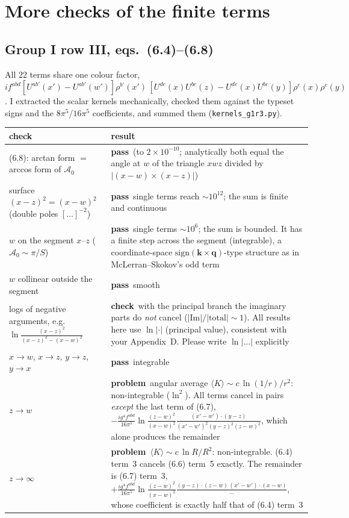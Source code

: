\documentclass[10pt]{article}
\newcommand{\ok}{\textcolor{green!45!black}{\textbf{pass}}}
\newcommand{\bad}{\textcolor{red!70!black}{\textbf{problem}}}
\newcommand{\warn}{\textcolor{orange!85!black}{\textbf{check}}}
\begin{document}
\section{More checks of the finite terms}\label{sec:more}
\subsection{Group I row III, eqs.~(6.4)--(6.8)}
All 22 terms share one colour factor, $i f^{abd}[U^{ab'}(x')-U^{ab'}(w')]\rho^{b'}(x')\,[U^{de}(x)U^{bc}(z)-U^{de}(x)U^{bc}(y)]\rho^e(x)\rho^c(y)$.
I extracted the scalar kernels mechanically, checked them against the typeset signs and the $8\pi^5$/$16\pi^5$ coefficients, and summed them (\texttt{kernels\_g1r3.py}).
\begin{center}
\begin{tabular}{p{6.2cm}p{9.2cm}}
\toprule
check & result\\
\midrule
(6.8): arctan form $=$ arccos form of $\mathcal A_0$ & \ok\ (to $2\times10^{-10}$; analytically both equal the angle at $w$ of the triangle $xwz$ divided by $|(x-w)\times(x-z)|$)\\
surface $(x-z)^2=(x-w)^2$ (double poles $[\dots]^{-2}$) & \ok\ single terms reach $\sim10^{12}$; the sum is finite and continuous\\
$w$ on the segment $x$--$z$ ($\mathcal A_0\sim\pi/S$) & \ok\ single terms $\sim10^6$; the sum is bounded. It has a finite step across the segment (integrable), a coordinate-space $\mathrm{sign}(\mathbf k\times\mathbf q)$-type structure as in McLerran--Skokov's odd term\\
$w$ collinear outside the segment & \ok\ smooth\\
logs of negative arguments, e.g.\ $\ln\frac{(x-z)^2}{(x-z)^2-(x-w)^2}$ & \warn\ with the principal branch the imaginary parts do \emph{not} cancel ($|\mathrm{Im}|/|\mathrm{total}|\sim1$). All results here use $\ln|\cdot|$ (principal value), consistent with your Appendix~D. Please write $\ln|\dots|$ explicitly\\
$x\to w$, $x\to z$, $y\to z$, $y\to x$ & \ok\ integrable\\
$z\to w$ & \bad\ angular average $\langle K\rangle\sim c\,\ln(1/r)/r^2$: non-integrable ($\ln^2$). All terms cancel in pairs \emph{except} the last term of (6.7), $-\frac{ig^4f^{abd}}{16\pi^5}\ln\frac{(z-w)^2}{(x-w)^2}\frac{(x'-w')\cdot(y-z)}{(x'-w')^2(y-z)^2(z-w)^2}$, which alone produces the remainder\\
$z\to\infty$ & \bad\ $\langle K\rangle\sim c\,\ln R/R^2$: non-integrable. (6.4) term~3 cancels (6.6) term~5 exactly. The remainder is (6.7) term~3, $+\frac{ig^4f^{abd}}{16\pi^5}\ln\frac{(z-w)^2}{(x-w)^2}\frac{(y-z)\cdot(z-w)\,(x'-w')\cdot(x-w)}{\cdots}$, whose coefficient is exactly half that of (6.4) term~3\\
\bottomrule
\end{tabular}
\end{center}
\end{document}
